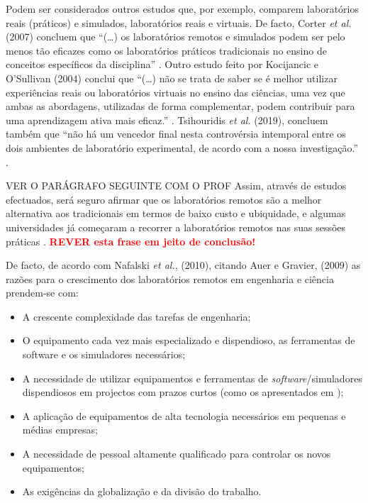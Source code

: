Podem ser considerados outros estudos que, por exemplo, comparem laboratórios reais (práticos) e simulados, laboratórios reais e virtuais. De facto, Corter \textit{et al.} (2007) concluem que ``(\ldots) os laboratórios remotos e simulados podem ser pelo menos tão eficazes como os laboratórios práticos tradicionais no ensino de conceitos específicos da disciplina'' \cite{StudyRemoteHandsonSimulatedLabs}. Outro estudo feito por Kocijancic e O'Sullivan (2004) conclui que ``(\ldots) não se trata de saber se é melhor utilizar experiências reais ou laboratórios virtuais no ensino das ciências, uma vez que ambas as abordagens, utilizadas de forma complementar, podem contribuir para uma aprendizagem ativa mais eficaz.'' \cite{RealorVirtualDilema}. Tsihouridis \textit{et al.} (2019), concluem também que ``não há um vencedor final nesta controvérsia intemporal entre os dois ambientes de laboratório experimental, de acordo com a nossa investigação.'' \cite{controversy}.

VER O PARÁGRAFO SEGUINTE COM O PROF
Assim, através de estudos efectuados, será seguro afirmar que os laboratórios remotos são a melhor alternativa aos tradicionais em termos de baixo custo e ubiquidade, e algumas universidades já começaram a recorrer a laboratórios remotos nas suas sessões práticas \cite{VISIREngineeringPractices}. \textbf{\textcolor{red}{REVER esta frase em jeito de conclusão!}}

De facto, de acordo com Nafalski \textit{et al.}, (2010)\cite{ExperiencesRemoteLaboratories}, citando Auer e Gravier, (2009)\cite{ThemMnyfacesRemotLab} as razões para o crescimento dos laboratórios remotos em engenharia e ciência prendem-se com:

\begin{itemize}
    \item A crescente complexidade das tarefas de engenharia;
    \item O equipamento cada vez mais especializado e dispendioso, as ferramentas de software e os simuladores necessários;
    \item A necessidade de utilizar equipamentos e ferramentas de \textit{software}/simuladores dispendiosos em projectos com prazos curtos (como os apresentados em \cite{ExperiencesRemoteLab});
    \item A aplicação de equipamentos de alta tecnologia necessários em pequenas e médias empresas;
    \item A necessidade de pessoal altamente qualificado para controlar os novos equipamentos;
    \item As exigências da globalização e da divisão do trabalho.
\end{itemize}

